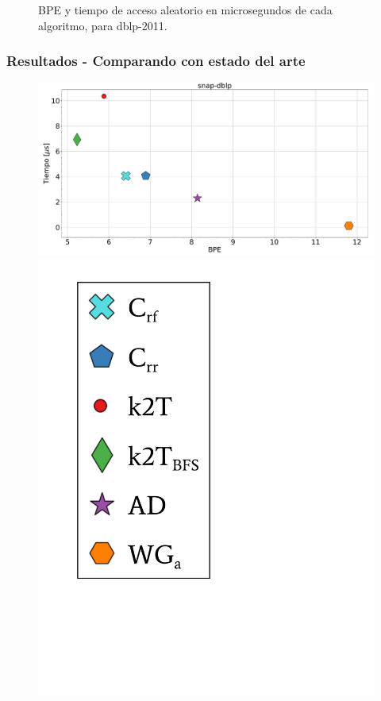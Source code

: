 \begin{frame}
\begin{figure}
	\caption{BPE y tiempo de acceso aleatorio en microsegundos de cada algoritmo, para dblp-2011.}
\end{figure}

\end{frame}

\begin{frame}
\frametitle{Resultados - Comparando con estado del arte}

\begin{figure}
	\centering
	
    	\begin{minipage}{1\textwidth}
    		\centering
    		\begin{minipage}{0.8\textwidth}
    			\centering
    			\includegraphics[width=1\linewidth]{../img/bpeTimes/aleatorio/snap-dblp.pdf}
    		\end{minipage}
    		\begin{minipage}{0.15\textwidth}
    			\centering
    			\includegraphics[scale=.16, clip, trim=70 200 280 40]{../img/bpeTimes/labelAle.pdf}

\end{minipage}
\end{minipage}
\end{figure}
\end{frame}
